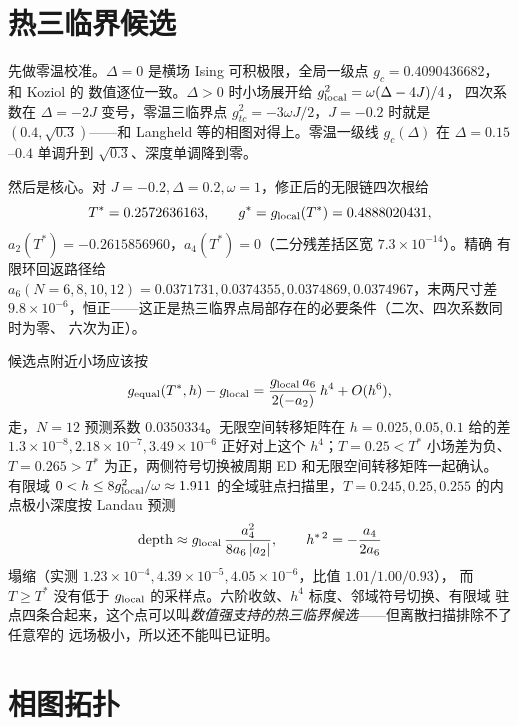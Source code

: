 \documentclass[UTF8,11pt,a4paper]{ctexart}
\begin{document}
\section{热三临界候选}

先做零温校准。$\Delta=0$ 是横场 Ising 可积极限，全局一级点 $g_c=0.4090436682$，和 Koziol 的
数值逐位一致\cite{Koziol2026Criticality}。$\Delta>0$ 时小场展开给 $g_{\rm local}^2=\omega(\Delta-4J)/4$，
四次系数在 $\Delta=-2J$ 变号，零温三临界点 $g_{tc}^2=-3\omega J/2$，$J=-0.2$ 时就是
$(0.4,\sqrt{0.3})$——和 Langheld 等的相图对得上\cite{Langheld2025Wormhole}。零温一级线
$g_c(\Delta)$ 在 $\Delta=0.15$--$0.4$ 单调升到 $\sqrt{0.3}$、深度单调降到零。

然后是核心。对 $J=-0.2,\Delta=0.2,\omega=1$，修正后的无限链四次根给
\begin{equation}
  T^\ast=0.2572636163,\qquad g^\ast=g_{\rm local}(T^\ast)=0.4888020431,
  \label{eq:candidate}
\end{equation}
$a_2(T^\ast)=-0.2615856960$，$a_4(T^\ast)=0$（二分残差括区宽 $7.3\times10^{-14}$）。精确
有限环回返路径给 $a_6(N{=}6,8,10,12)=0.0371731,0.0374355,0.0374869,0.0374967$，末两尺寸差
$9.8\times10^{-6}$，恒正——这正是热三临界点局部存在的必要条件（二次、四次系数同时为零、
六次为正）。

候选点附近小场应该按
\begin{equation}
  g_{\rm equal}(T^\ast,h)-g_{\rm local}
  =\frac{g_{\rm local}\,a_6}{2(-a_2)}\,h^4+O(h^6),
  \label{eq:h4}
\end{equation}
走，$N=12$ 预测系数 $0.0350334$。无限空间转移矩阵在 $h=0.025,0.05,0.1$ 给的差
$1.3\times10^{-8},2.18\times10^{-7},3.49\times10^{-6}$ 正好对上这个 $h^4$；$T=0.25<T^\ast$
小场差为负、$T=0.265>T^\ast$ 为正，两侧符号切换被周期 ED 和无限空间转移矩阵一起确认。
有限域 $0<h\le8g_{\rm local}^2/\omega\approx1.911$ 的全域驻点扫描里，$T=0.245,0.25,0.255$
的内点极小深度按 Landau 预测
\begin{equation}
  \mathrm{depth}\approx g_{\rm local}\,\frac{a_4^2}{8a_6\,|a_2|},\qquad h^{\ast\,2}=-\frac{a_4}{2a_6}
  \label{eq:depth}
\end{equation}
塌缩（实测 $1.23\times10^{-4},4.39\times10^{-5},4.05\times10^{-6}$，比值 $1.01/1.00/0.93$），
而 $T\ge T^\ast$ 没有低于 $g_{\rm local}$ 的采样点。六阶收敛、$h^4$ 标度、邻域符号切换、有限域
驻点四条合起来，这个点可以叫\emph{数值强支持的热三临界候选}——但离散扫描排除不了任意窄的
远场极小，所以还不能叫已证明。

\section{相图拓扑}
\end{document}
